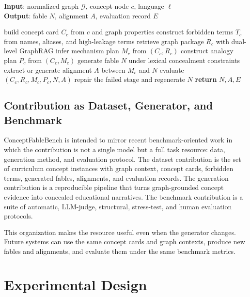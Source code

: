 \documentclass[letterpaper]{article} %
\begin{document}
\begin{algorithm}[t]
\caption{Graph-Grounded Concept-to-Fable Generation}
\label{alg:generation}
\textbf{Input}: normalized graph $\mathcal{G}$, concept node $c$, language $\ell$\\
\textbf{Output}: fable $N$, alignment $A$, evaluation record $E$
\begin{algorithmic}[1]
\STATE build concept card $C_c$ from $c$ and graph properties
\STATE construct forbidden terms $T_c$ from names, aliases, and high-leakage terms
\STATE retrieve graph package $R_c$ with dual-level GraphRAG
\STATE infer mechanism plan $M_c$ from $(C_c, R_c)$
\STATE construct analogy plan $P_c$ from $(C_c, M_c)$
\STATE generate fable $N$ under lexical concealment constraints
\STATE extract or generate alignment $A$ between $M_c$ and $N$
\STATE evaluate $(C_c, R_c, M_c, P_c, N, A)$
    \STATE repair the failed stage and regenerate $N$
\ENDIF
\STATE \textbf{return} $N, A, E$
\end{algorithmic}
\end{algorithm}

\subsection{Contribution as Dataset, Generator, and Benchmark}

ConceptFableBench is intended to mirror recent benchmark-oriented work in which the contribution is not a single model but a full task resource: data, generation method, and evaluation protocol. The dataset contribution is the set of curriculum concept instances with graph context, concept cards, forbidden terms, generated fables, alignments, and evaluation records. The generation contribution is a reproducible pipeline that turns graph-grounded concept evidence into concealed educational narratives. The benchmark contribution is a suite of automatic, LLM-judge, structural, stress-test, and human evaluation protocols.

This organization makes the resource useful even when the generator changes. Future systems can use the same concept cards and graph contexts, produce new fables and alignments, and evaluate them under the same benchmark metrics.

\section{Experimental Design}
\end{document}
